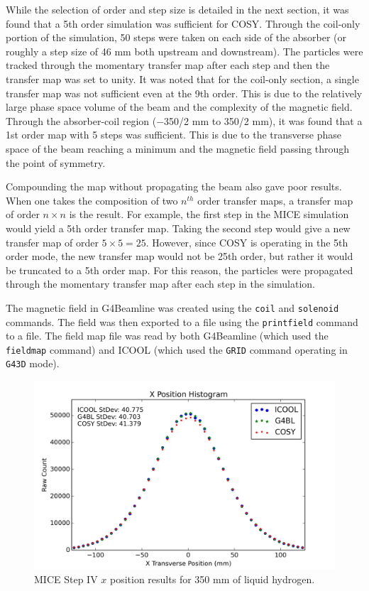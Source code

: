 While the selection of order and step size is detailed in the next section, it was found that a 5th order simulation was sufficient for COSY. Through the coil-only portion of the simulation, 50 steps were taken on each side of the absorber (or roughly a step size of 46 mm both upstream and downstream). The particles were tracked through the momentary transfer map after each step and then the transfer map was set to unity. It was noted that for the coil-only section, a single transfer map was not sufficient even at the 9th order. This is due to the relatively large phase space volume of the beam and the complexity of the magnetic field. Through the absorber-coil region ($-$350/2 mm to 350/2 mm), it was found that a 1st order map with 5 steps was sufficient. This is due to the transverse phase space of the beam reaching a minimum and the magnetic field passing through the point of symmetry.

Compounding the map without propagating the beam also gave poor results. When one takes the composition of two $n^{th}$ order transfer maps, a transfer map of order $n\times n$ is the result. For example, the first step in the MICE simulation would yield a 5th order transfer map. Taking the second step would give a new transfer map of order $5\times 5 = 25$. However, since COSY is operating in the 5th order mode, the new transfer map would not be 25th order, but rather it would be truncated to a 5th order map. For this reason, the particles were propagated through the momentary transfer map after each step in the simulation.

The magnetic field in G4Beamline was created using the \texttt{coil} and \texttt{solenoid} commands. The field was then exported to a file using the \texttt{printfield} command to a file. The field map file was read by both G4Beamline (which used the \texttt{fieldmap} command) and ICOOL (which used the \texttt{GRID} command operating in \texttt{G43D} mode).

\begin{figure}[H]
  \centering
    \includegraphics[width=\textwidth]{MICE data/x} 
  \caption{MICE Step IV $x$ position results for 350 mm of liquid hydrogen.}
  \label{fig:micex}
\end{figure}

